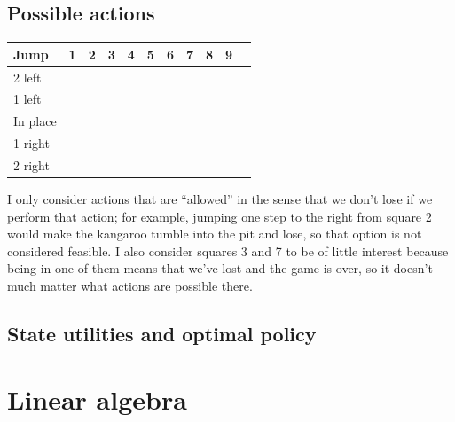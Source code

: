 \documentclass[letterpaper, 10pt]{article}
\begin{document}
\begin{multicols}{2}
\subsection{Possible actions}
\begin{tabular}{lcccccccccc}
	Jump & 1 & 2 & 3 & 4 & 5 & 6 & 7 & 8 & 9 \\
	\midrule
	2 left   & \checkmark & \checkmark & & \checkmark & & \checkmark & & \checkmark &  \\
	1 left   & \checkmark & \checkmark & & & \checkmark & \checkmark & & & \checkmark \\
	In place & \checkmark & \checkmark & & \checkmark & \checkmark & \checkmark & & \checkmark & \checkmark \\
	1 right  & \checkmark & & & \checkmark & \checkmark & & & \checkmark & \checkmark \\
	2 right  & & \checkmark & & \checkmark & & \checkmark & & \checkmark & \checkmark \\
\end{tabular}

\vspace{10pt}

\noindent 
I only consider actions that are ``allowed'' in the sense that we don't lose if we perform that action; for example, jumping one step to the right from square 2 would make the kangaroo tumble into the pit and lose, so that option is not considered feasible. I also consider squares 3 and 7 to be of little interest because being in one of them means that we've lost and the game is over, so it doesn't much matter what actions are possible there.

\subsection{State utilities and optimal policy}

\end{multicols}

\clearpage
\appendix

\section{Linear algebra}
\end{document}
